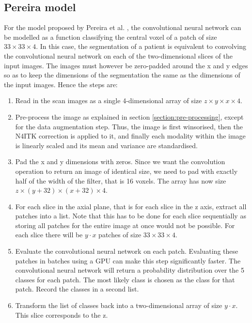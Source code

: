 \documentclass[12pt,a4paper,twoside,openright]{report}
\begin{document}
\subsection{Pereira model}
For the model proposed by Pereira et al. \cite{pereira}, the convolutional neural network can be modelled as a function classifying the central voxel of a patch of size $33 \times 33 \times 4$. In this case, the segmentation of a patient is equivalent to convolving the convolutional neural network on each of the two-dimensional slices of the input images. The images must however be zero-padded around the x and y edges so as to keep the dimensions of the segmentation the same as the dimensions of the input images. Hence the steps are:
\begin{enumerate}
	\item Read in the scan images as a single 4-dimensional array of size $z \times y \times x \times 4$.
	\item Pre-process the image as explained in section \ref{section:pre-processing}, except for the data augmentation step. Thus, the image is first winsorised, then the N4ITK correction is applied to it, and finally each modality within the image is linearly scaled and its mean and variance are standardised.
	\item Pad the x and y dimensions with zeros. Since we want the convolution operation to return an image of identical size, we need to pad with exactly half of the width of the filter, that is 16 voxels. The array has now size $z \times (y + 32) \times (x + 32) \times 4$.
	\item For each slice in the axial plane, that is for each slice in the z axis, extract all patches into a list. Note that this has to be done for each slice sequentially as storing all patches for the entire image at once would not be possible. For each slice there will be $y \cdot x$ patches of size $33 \times 33 \times 4$.
	\item Evaluate the convolutional neural network on each patch. Evaluating these patches in batches using a GPU can make this step significantly faster. The convolutional neural network will return a probability distribution over the 5 classes for each patch. The most likely class is chosen as the class for that patch. Record the classes in a second list.
	\item Transform the list of classes back into a two-dimensional array of size $y \cdot x$. This slice corresponds to the z.
\end{enumerate}
\end{document}
